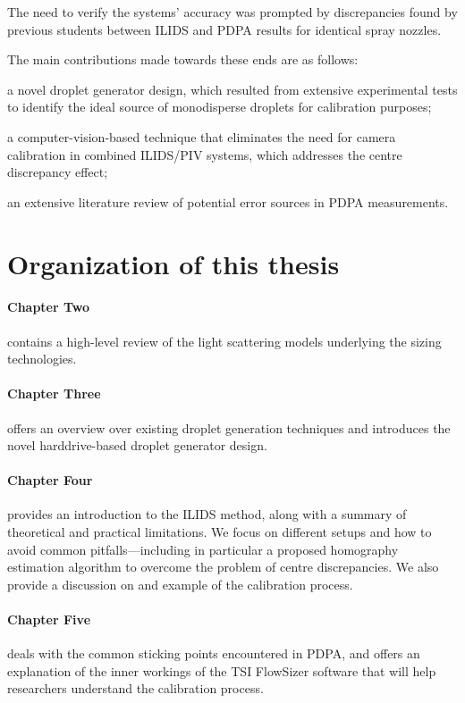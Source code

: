 \documentclass[11.5pt,oneside]{book}
\begin{document}
The need to verify the systems' accuracy was prompted by discrepancies found by
previous students between ILIDS and PDPA results for identical spray nozzles.

The main contributions made towards these ends are as follows:
\begin{alist}
\item a novel droplet generator design, which resulted from extensive
        experimental tests to identify the ideal source of monodisperse droplets
        for calibration purposes;
\item a computer-vision-based technique that eliminates the need for camera
        calibration in combined ILIDS/PIV systems, which addresses the centre
        discrepancy effect;
\item an extensive literature review of potential error sources in PDPA
        measurements.
\end{alist}

\section{Organization of this thesis}
\paragraph{Chapter Two} contains a high-level review of the light scattering models
underlying the sizing technologies.

\paragraph{Chapter Three} offers an overview over
existing droplet generation techniques and introduces the novel harddrive-based
droplet generator design.

\paragraph{Chapter Four} provides an introduction to the ILIDS
method, along with a summary of theoretical and practical limitations. We focus
on different setups and how to avoid common pitfalls—including in
particular a proposed homography estimation algorithm to overcome the problem of
centre discrepancies. We also provide a discussion on and example of the
calibration process.

\paragraph{Chapter Five} deals with the common sticking points
encountered in PDPA, and offers an explanation of the inner workings of the TSI
FlowSizer software that will help researchers understand the calibration
process.
\end{document}
